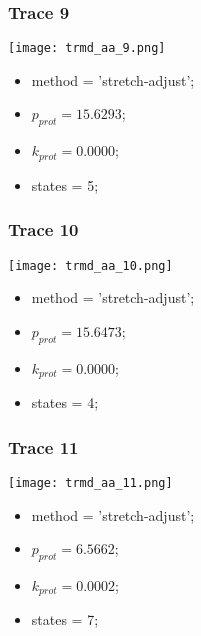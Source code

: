 \subsubsection{Trace 9}
\begin{minipage}[c]{0.7\textwidth}
    \texttt{[image: trmd\_aa\_9.png]}
\end{minipage}
\hfill
\begin{minipage}[c]{0.45\textwidth}
    \begin{itemize}
        \item method = 'stretch-adjust';
        \item $p_{prot}=15.6293$;
        \item $k_{prot}=0.0000$;
        \item states = 5;
    \end{itemize}
\end{minipage}

\subsubsection{Trace 10}
\begin{minipage}[c]{0.7\textwidth}
    \texttt{[image: trmd\_aa\_10.png]}
\end{minipage}
\hfill
\begin{minipage}[c]{0.45\textwidth}
    \begin{itemize}
        \item method = 'stretch-adjust';
        \item $p_{prot}=15.6473$;
        \item $k_{prot}=0.0000$;
        \item states = 4;
    \end{itemize}
\end{minipage}

\subsubsection{Trace 11}
\begin{minipage}[c]{0.7\textwidth}
    \texttt{[image: trmd\_aa\_11.png]}
\end{minipage}
\hfill
\begin{minipage}[c]{0.45\textwidth}
    \begin{itemize}
        \item method = 'stretch-adjust';
        \item $p_{prot}=6.5662$;
        \item $k_{prot}=0.0002$;
        \item states = 7;
    \end{itemize}
\end{minipage}

